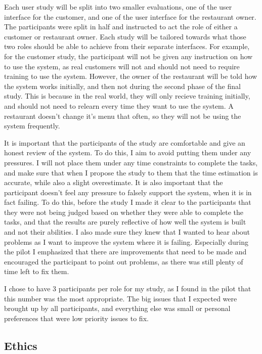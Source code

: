 Each user study will be split into two smaller evaluations, one of the user interface for the customer, and one of the user interface for the restaurant owner. The participants were split in half and instructed to act the role of either a customer or restaurant owner. Each study will be tailored towards what those two roles should be able to achieve from their separate interfaces. For example, for the customer study, the participant will not be given any instruction on how to use the system, as real customers will not and should not need to require training to use the system. However, the owner of the restaurant will be told how the system works initially, and then not during the second phase of the final study. This is because in the real world, they will only recieve training initially, and should not need to relearn every time they want to use the system. A restaurant doesn't change it's menu that often, so they will not be using the system frequently.

It is important that the participants of the study are comfortable and give an honest review of the system. To do this, I aim to avoid putting them under any pressures. I will not place them under any time constraints to complete the tasks, and make sure that when I propose the study to them that the time estimation is accurate, while also a slight overestimate. It is also important that the participant doesn't feel any pressure to falsely support the system, when it is in fact failing. To do this, before the study I made it clear to the participants that they were not being judged based on whether they were able to complete the tasks, and that the results are purely reflective of how well the system is built and not their abilities. I also made sure they knew that I wanted to hear about problems as I want to improve the system where it is failing. Especially during the pilot I emphasized that there are improvements that need to be made and encouraged the participant to point out problems, as there was still plenty of time left to fix them.

I chose to have 3 participants per role for my study, as I found in the pilot that this number was the most appropriate. The big issues that I expected were brought up by all participants, and everything else was small or personal preferences that were low priority issues to fix.

\subsection{Ethics}

